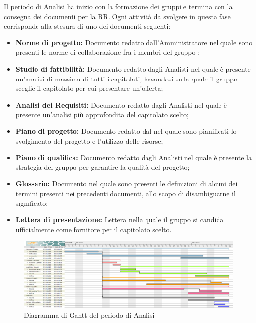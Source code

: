 Il periodo di Analisi ha inizio con la formazione dei gruppi e termina con la consegna dei documenti per la RR. \newline
Ogni attività da svolgere in questa fase corrisponde alla stesura di uno dei documenti seguenti: 
\begin{itemize}
	\item \textbf{Norme di progetto: }
	Documento redatto dall'Amministratore nel quale sono presenti le norme di collaborazione fra i membri del gruppo \gruppo ;
	\item \textbf{Studio di fattibilità: }
	Documento redatto dagli Analisti nel quale è presente un'analisi di massima di tutti 	i capitolati, basandosi sulla quale il gruppo sceglie il capitolato per cui presentare un'offerta;
	\item \textbf{Analisi dei Requisiti: }
	Documento redatto dagli Analisti nel quale è presente un'analisi più approfondita del capitolato scelto;
	\item \textbf{Piano di progetto: }
	Documento redatto dal \Res nel quale sono pianificati lo svolgimento del progetto e l'utilizzo delle risorse;
	\item \textbf{Piano di qualifica: }
	Documento redatto dagli Analisti nel quale è presente la strategia del gruppo \gruppo \space per garantire la qualità del progetto;
	\item \textbf{Glossario: }
	Documento nel quale sono presenti le definizioni di alcuni dei termini presenti nei precedenti documenti, allo scopo di disambiguarne il significato;
	\item \textbf{Lettera di presentazione: }
	Lettera nella quale il gruppo \gruppo \space si candida ufficialmente come fornitore per il capitolato scelto.
\end{itemize}

\begin{figure}[H]
	\includegraphics[width=1\linewidth]{Pianificazione/Analisi_Gantt.png}
	\caption{Diagramma di Gantt del periodo di Analisi}
\end{figure}

